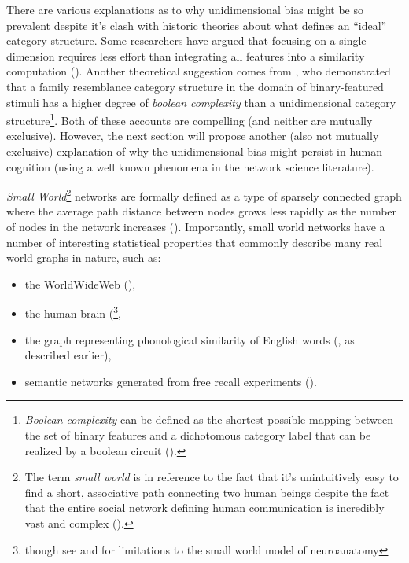 \documentclass[12pt]{article}
\let\oldcite=\cite
\let\oldtextcite=\textcite
\renewcommand{\cite}[1]{\textcolor[rgb]{0, .121, .388}{\oldcite{#1}}}
\renewcommand{\textcite}[1]{\textcolor[rgb]{0, .121, .388}{\oldtextcite{#1}}}
\begin{document}
There are various explanations as to why unidimensional bias might be so prevalent despite it's clash with historic theories about what defines an ``ideal'' category structure. Some researchers have argued that focusing on a single dimension requires less effort than integrating all features into a similarity computation (\cite{wills2013overall}). Another theoretical suggestion comes from \textcite{feldman2000minimization}, who demonstrated that a family resemblance category structure in the domain of binary-featured stimuli has a higher degree of \emph{boolean complexity} than a unidimensional category structure\footnote{\emph{Boolean complexity} can be defined as the shortest possible mapping between the set of binary features and a dichotomous category label that can be realized by a boolean circuit (\cite{feldman2000minimization}).}. Both of these accounts are compelling (and neither are mutually exclusive). However, the next section will propose another (also not mutually exclusive) explanation of why the unidimensional bias might persist in human cognition (using a well known phenomena in the network science literature).

\emph{Small World}\footnote{The term \emph{small world} is in reference to the fact that it's unintuitively easy to find a short, associative path connecting two human beings despite the fact that the entire social network defining human communication is incredibly vast and complex (\cite{newman2003structure}).} networks are formally defined as a type of sparsely connected graph where the average path distance between nodes grows less rapidly as the number of nodes in the network increases (\cite{porter2012small}). Importantly, small world networks have a number of interesting statistical properties that commonly describe many real world graphs in nature, such as:

\begin{itemize}
    \item the WorldWideWeb (\cite{newman2003structure}),
    \item the human brain (\cite{bassett2006small}\footnote{though see \textcite{hilgetag2016brain} and \textcite{papo2016beware} for limitations to the small world model of neuroanatomy},
    \item the graph representing phonological similarity of English words (\cite{vitevitch2008can}, as described earlier),
    \item semantic networks generated from free recall experiments (\cite{steyvers2005large,nelson2004university}).
\end{itemize} 
\end{document}
